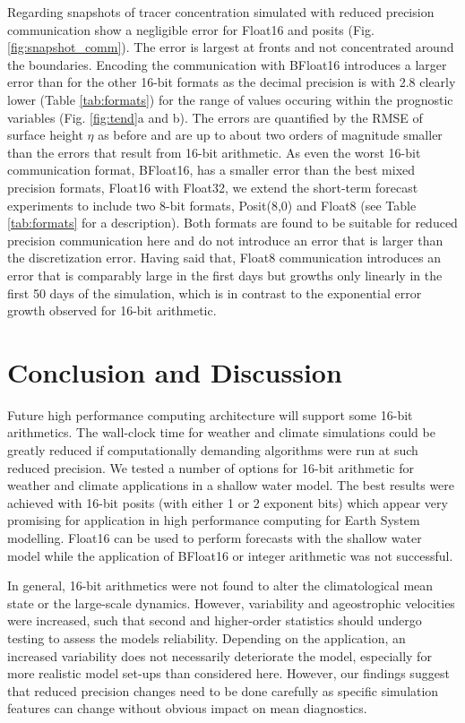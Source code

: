 \documentclass[draft]{agujournal2019}
\begin{document}
Regarding snapshots of tracer concentration simulated with reduced precision
communication show a negligible error for Float16 and posits (Fig. \ref{fig:snapshot_comm}).
The error is largest at fronts and not concentrated around the boundaries.
Encoding the communication with BFloat16 introduces a larger error than for the
other 16-bit formats as the decimal precision is with 2.8 clearly lower
(Table \ref{tab:formats}) for the range of values occuring within the prognostic
variables (Fig. \ref{fig:tend}a and b). The errors are quantified by the RMSE of
surface height $\eta$ as before and are up to about two orders of magnitude smaller
than the errors that result from 16-bit arithmetic. As even the worst 16-bit
communication format, BFloat16, has a smaller error than the best mixed precision
formats, Float16 with Float32, we extend the short-term forecast experiments to
include two 8-bit formats, Posit(8,0) and Float8 (see Table \ref{tab:formats} for
a description). Both formats are found to be suitable for reduced precision
communication here and do not introduce an error that is larger than the
discretization error. Having said that, Float8 communication introduces an error
that is comparably large in the first days but growths only linearly in the first
50 days of the simulation, which is in contrast to the exponential error growth
observed for 16-bit arithmetic.

\section{Conclusion and Discussion}
\label{sec:discuss}

Future high performance computing architecture will support some 16-bit
arithmetics. The wall-clock time for weather and climate simulations could
be greatly reduced if computationally demanding algorithms were run at such
reduced precision. We tested a number of options for 16-bit arithmetic for
weather and climate applications in a shallow water model. The best results
were achieved with 16-bit posits (with either 1 or 2 exponent bits) which appear
very promising for application in high performance computing for Earth System
modelling. Float16 can be used to perform forecasts with the shallow water model
while the application of BFloat16 or integer arithmetic was not successful.

In general, 16-bit arithmetics were not found to alter the climatological mean
state or the large-scale dynamics. However, variability and ageostrophic velocities
were increased, such that second and higher-order statistics should undergo
testing to assess the models reliability. Depending on the application, an increased
variability does not necessarily deteriorate the model, especially for more
realistic model set-ups than considered here. However, our findings suggest that
reduced precision changes need to be done carefully as specific simulation features
can change without obvious impact on mean diagnostics.
\end{document}
